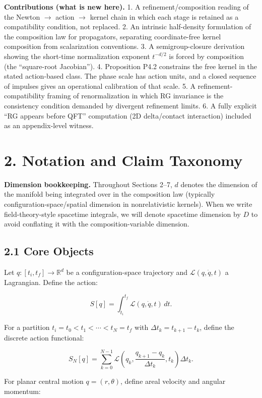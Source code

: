 \documentclass[
]{article}
\begin{document}
\textbf{Contributions (what is new here).} 1. A refinement/composition
reading of the Newton \(\to\) action \(\to\) kernel chain in which each
stage is retained as a compatibility condition, not replaced. 2. An
intrinsic half-density formulation of the composition law for
propagators, separating coordinate-free kernel composition from
scalarization conventions. 3. A semigroup-closure derivation showing the
short-time normalization exponent \(t^{-d/2}\) is forced by composition
(the ``square-root Jacobian''). 4. Proposition P4.2 constrains the free
kernel in the stated action-based class. The phase scale has action
units, and a closed sequence of impulses gives an operational
calibration of that scale. 5. A refinement-compatibility framing of
renormalization in which RG invariance is the consistency condition
demanded by divergent refinement limits. 6. A fully explicit ``RG
appears before QFT'' computation (2D delta/contact interaction) included
as an appendix-level witness.

\section{2. Notation and Claim
Taxonomy}\label{notation-and-claim-taxonomy}

\textbf{Dimension bookkeeping.} Throughout Sections 2--7, \(d\) denotes
the dimension of the manifold being integrated over in the composition
law (typically configuration-space/spatial dimension in nonrelativistic
kernels). When we write field-theory-style spacetime integrals, we will
denote spacetime dimension by \(D\) to avoid conflating it with the
composition-variable dimension.

\subsection{2.1 Core Objects}\label{core-objects}

Let \(q:[t_i,t_f]\to \mathbb{R}^d\) be a configuration-space trajectory
and \(\mathcal{L}(q,\dot q,t)\) a Lagrangian. Define the action:

\[
S[q] = \int_{t_i}^{t_f} \mathcal{L}(q,\dot q,t)\,dt.
\]

For a partition \(t_i=t_0< t_1<\cdots<t_N=t_f\) with
\(\Delta t_k=t_{k+1}-t_k\), define the discrete action functional:

\[
S_N[q] = \sum_{k=0}^{N-1} \mathcal{L}\!\left(q_k,\frac{q_{k+1}-q_k}{\Delta t_k},t_k\right)\Delta t_k.
\]

For planar central motion \(q=(r,\theta)\), define areal velocity and
angular momentum:
\end{document}
